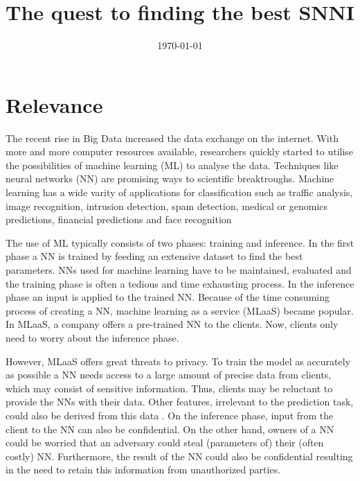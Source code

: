 \documentclass{uva-inf-article}
\title{The quest to finding the best SNNI}
\date{\today}
\begin{document}
\maketitle




\section{Relevance}
The recent rise in Big Data increased the data exchange on the internet. With more and more computer resources available, researchers quickly started to utilise the possibilities of machine learning (ML) to analyse the data.  Techniques like neural networks (NN) are promising ways to scientific breaktroughs. Machine learning has a wide varity of applications for classification such as traffic analysis, image recognition, intrusion detection,  spam detection, medical or genomics predictions,  financial predictions and face recognition \parencite{Dowlin2017, Islam2011, Bachrach16, Kaiming215}

The use of ML typically consists of two phases: training and inference. In the first phase a NN is trained by feeding an extensive dataset to find the best parameters. NNs used for machine learning have to be maintained, evaluated and the training phase is often a tedious and time exhausting process. In the inference phase an input is applied to the trained NN. Because of the time consuming process of creating a NN, machine learning as a service (MLaaS) became popular. In MLaaS, a company offers a pre-trained NN to the clients. Now, clients only need to worry about the inference phase.

However, MLaaS offers great threats to privacy. To train the model as accurately as possible a NN needs access to a large amount of precise data from clients, which may consist of sensitive information. Thus, clients may be reluctant to provide the NNs with their data. Other features, irrelevant to the prediction task, could also be derived from this data \parencite{Nasr2019}. On the inference phase, input from the client to the NN can also be confidential. On the other hand, owners of a NN could be worried that an adversary could steal (parameters of) their (often costly) NN. Furthermore, the result of the NN could also be confidential resulting in the need to retain this information from unauthorized parties. 
\end{document}
